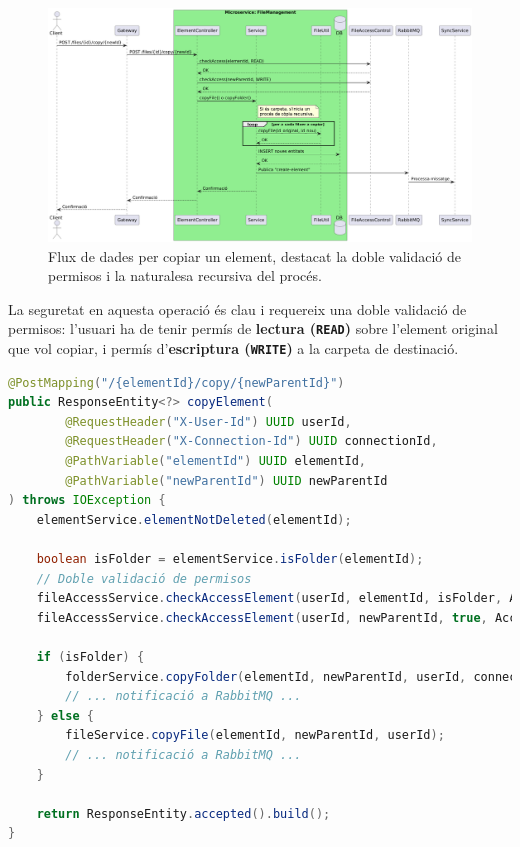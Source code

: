 \begin{figure}[H]
    \centering
    \includegraphics[width=\textwidth]{Figures/flux/copy_files.png}
    \caption{Flux de dades per copiar un element, destacat la doble validació de permisos i la naturalesa recursiva del procés.}
\end{figure}

La seguretat en aquesta operació és clau i requereix una doble validació de permisos: l'usuari ha de tenir permís de \textbf{lectura (\texttt{READ})} sobre l'element original que vol copiar, i permís d'\textbf{escriptura (\texttt{WRITE})} a la carpeta de destinació.

\begin{lstlisting}[language=Java, caption={Endpoint per a la còpia d'elements a `ElementController`}]
@PostMapping("/{elementId}/copy/{newParentId}")
public ResponseEntity<?> copyElement(
        @RequestHeader("X-User-Id") UUID userId,
        @RequestHeader("X-Connection-Id") UUID connectionId,
        @PathVariable("elementId") UUID elementId,
        @PathVariable("newParentId") UUID newParentId
) throws IOException {
    elementService.elementNotDeleted(elementId);
    
    boolean isFolder = elementService.isFolder(elementId);
    // Doble validació de permisos
    fileAccessService.checkAccessElement(userId, elementId, isFolder, AccessType.READ);
    fileAccessService.checkAccessElement(userId, newParentId, true, AccessType.WRITE);

    if (isFolder) {
        folderService.copyFolder(elementId, newParentId, userId, connectionId.toString());
        // ... notificació a RabbitMQ ...
    } else {
        fileService.copyFile(elementId, newParentId, userId);
        // ... notificació a RabbitMQ ...
    }

    return ResponseEntity.accepted().build();
}
\end{lstlisting}

